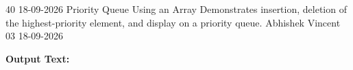 \clearpage
\label{prog:40}
\programhead
  {40}
  {18-09-2026}
  {Priority Queue Using an Array}
  {Demonstrates insertion, deletion of the highest-priority element, and display on a priority queue.}
  {Abhishek Vincent}
  {03}
  {18-09-2026}

\divider
\textbf{Output Text:}\par
\vspace{2pt}

